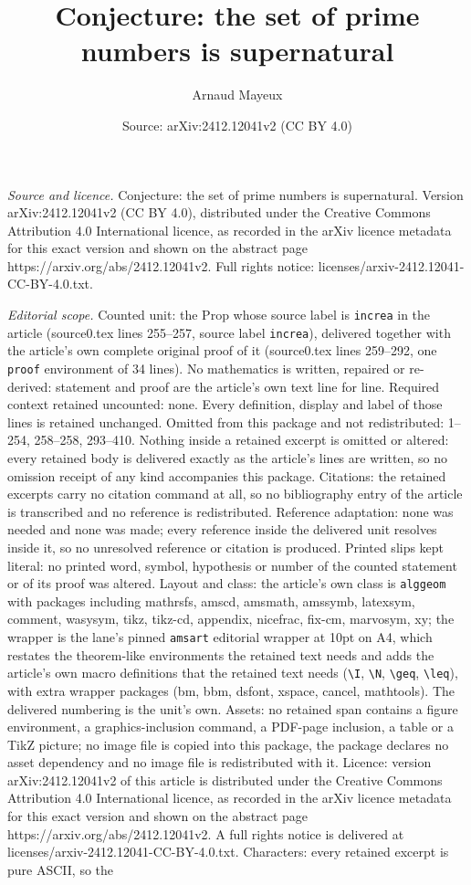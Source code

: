 \documentclass[10pt,a4paper]{amsart}
\title[Conjecture: the set of prime numbers is supernatural]{Conjecture: the set of prime numbers is supernatural}
\author{Arnaud Mayeux}
\date{Source: arXiv:2412.12041v2 (CC BY 4.0)}
\begin{document}
\maketitle

\noindent\emph{Source and licence.} Conjecture: the set of prime numbers is supernatural. Version arXiv:2412.12041v2 (CC BY 4.0), distributed under the Creative Commons Attribution 4.0 International licence, as recorded in the arXiv licence metadata for this exact version and shown on the abstract page https://arxiv.org/abs/2412.12041v2. Full rights notice: licenses/arxiv-2412.12041-CC-BY-4.0.txt.\par\smallskip

\noindent\textit{Editorial scope.} Counted unit: the Prop whose source label is \texttt{increa} in the article (source0.tex lines 255--257, source label \texttt{increa}), delivered together with the article's own complete original proof of it (source0.tex lines 259--292, one \texttt{proof} environment of 34 lines). No mathematics is written, repaired or re-derived: statement and proof are the article's own text line for line. Required context retained uncounted: none. Every definition, display and label of those lines is retained unchanged. Omitted from this package and not redistributed: 1--254, 258--258, 293--410. Nothing inside a retained excerpt is omitted or altered: every retained body is delivered exactly as the article's lines are written, so no omission receipt of any kind accompanies this package. Citations: the retained excerpts carry no citation command at all, so no bibliography entry of the article is transcribed and no reference is redistributed. Reference adaptation: none was needed and none was made; every reference inside the delivered unit resolves inside it, so no unresolved reference or citation is produced. Printed slips kept literal: no printed word, symbol, hypothesis or number of the counted statement or of its proof was altered. Layout and class: the article's own class is \texttt{alggeom} with packages including mathrsfs, amscd, amsmath, amssymb, latexsym, comment, wasysym, tikz, tikz-cd, appendix, nicefrac, fix-cm, marvosym, xy; the wrapper is the lane's pinned \texttt{amsart} editorial wrapper at 10pt on A4, which restates the theorem-like environments the retained text needs and adds the article's own macro definitions that the retained text needs (\texttt{\textbackslash I}, \texttt{\textbackslash N}, \texttt{\textbackslash geq}, \texttt{\textbackslash leq}), with extra wrapper packages (bm, bbm, dsfont, xspace, cancel, mathtools). The delivered numbering is the unit's own. Assets: no retained span contains a figure environment, a graphics-inclusion command, a PDF-page inclusion, a table or a TikZ picture; no image file is copied into this package, the package declares no asset dependency and no image file is redistributed with it. Licence: version arXiv:2412.12041v2 of this article is distributed under the Creative Commons Attribution 4.0 International licence, as recorded in the arXiv licence metadata for this exact version and shown on the abstract page https://arxiv.org/abs/2412.12041v2. A full rights notice is delivered at licenses/arxiv-2412.12041-CC-BY-4.0.txt. Characters: every retained excerpt is pure ASCII, so the 
\end{document}

